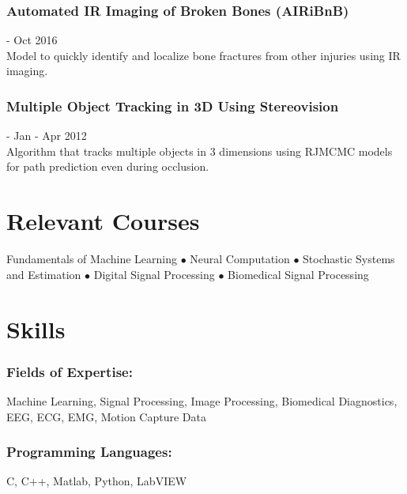 \documentclass{article}
\begin{document}
 \subsubsection{Automated IR Imaging of Broken Bones (AIRiBnB)} \hfill - Oct 2016\\
\noindent 
Model to quickly identify and localize bone fractures from other injuries using IR imaging.\\
    
\subsubsection{Multiple Object Tracking in 3D Using Stereovision} \hfill - Jan - Apr 2012\\
Algorithm that tracks multiple objects in 3 dimensions using RJMCMC models for path prediction even during occlusion.
    


\section{Relevant Courses}
Fundamentals of Machine Learning $\bullet$ Neural Computation $\bullet$ Stochastic Systems and Estimation $\bullet$ Digital Signal Processing $\bullet$ Biomedical Signal Processing 

\section{Skills}
\subsubsection{Fields of Expertise:} 
Machine Learning, Signal Processing, Image Processing, Biomedical Diagnostics, EEG, ECG, EMG, Motion Capture Data
\subsubsection{Programming Languages:} 
C, C++, Matlab, Python, LabVIEW
\end{document}
